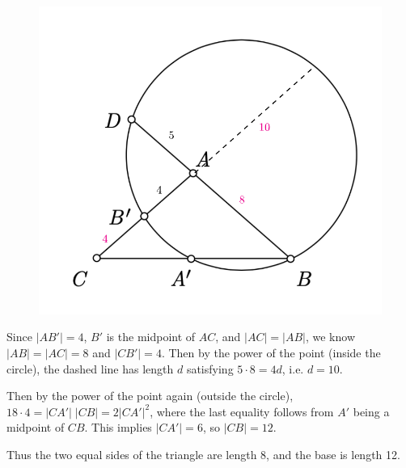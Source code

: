 \documentclass[twoside,10pt]{article}
\begin{document}
\begin{figure}[H]
	\centering
	\includegraphics[scale=0.6]{fig/57.pdf}
\end{figure}

Since $|AB'|=4$, $B'$ is the midpoint of $ AC$, and $|AC|=|AB|$, we know $|AB|=|AC|=8$ and $|CB'|=4$. Then by the power of the point (inside the circle), the dashed line has length $d$ satisfying $5 \cdot 8 = 4d$, i.e. $d=10$.

Then by the power of the point again (outside the circle), $18 \cdot 4 = |CA'|\;|CB| = 2 |CA'|^2$, where the last equality follows from $A'$ being a midpoint of $CB$. This implies $|CA'|=6$, so $|CB|=12$.

Thus the two equal sides of the triangle are length 8, and the base is length 12.

\newpage
\end{document}
